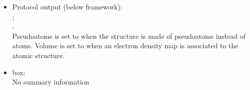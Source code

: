 \begin{itemize}
   \begin{itemize}
     \item Protocol output (below \scipion framework):\\ ;\\ .\\Pseudoatoms is set to  when the structure is made of pseudoatoms instead of atoms. Volume is set to  when an electron density map is associated to the atomic structure.
     \item {} box:\\No summary information
    \end{itemize}
  
 \end{itemize}

